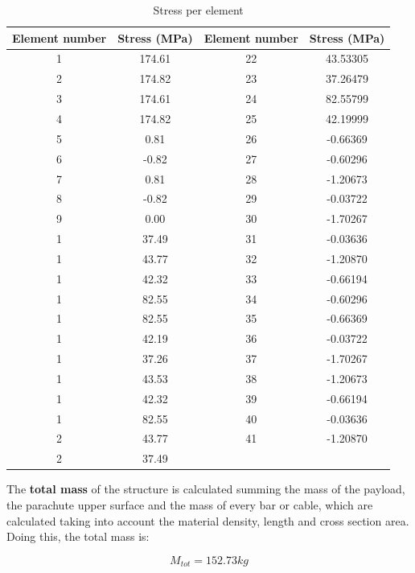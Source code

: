 \begin{table}[h]
\centering
\begin{tabular}{|c|c|c|c|}
\hline
\textbf{Element number} & \textbf{Stress (MPa)} & \textbf{Element number} & \textbf{Stress (MPa)} \\ \hline
1 &  174.61  &  22 &  43.53305 \\ \hline
2 &  174.82  &  23 &  37.26479 \\ \hline
3 &  174.61  &  24 &  82.55799 \\ \hline
4 &  174.82  &  25 &  42.19999 \\ \hline
5 &    0.81  &  26 &  -0.66369 \\ \hline
6 &   -0.82  &  27 &  -0.60296 \\ \hline
7 &    0.81  &  28 &  -1.20673 \\ \hline
8 &   -0.82  &  29 &  -0.03722 \\ \hline
9 &    0.00  &  30 &  -1.70267 \\ \hline
1 &    37.49 &   31 &  -0.03636 \\ \hline
1 &    43.77 &   32 &  -1.20870 \\ \hline
1 &    42.32 &   33 &  -0.66194 \\ \hline
1 &    82.55 &   34 &  -0.60296 \\ \hline
1 &    82.55 &   35 &  -0.66369 \\ \hline
1 &    42.19 &   36 &  -0.03722 \\ \hline
1 &    37.26 &   37 &  -1.70267 \\ \hline
1 &    43.53 &   38 &  -1.20673 \\ \hline
1 &    42.32 &   39 &  -0.66194 \\ \hline
1 &    82.55 &   40 &  -0.03636 \\ \hline
2 &    43.77 &   41 &  -1.20870 \\ \hline
2 &    37.49 &    &   \\ \hline
\end{tabular}
\caption{Stress per element}
\label{tab:stress}
\end{table}

The \textbf{total mass} of the structure is calculated summing the mass of the payload,
the parachute upper surface and the mass of every bar or cable, which are
calculated taking into account the material density, length and cross section
area. Doing this, the total mass is:

\begin{equation}
	\boxed{M_{tot} = 152.73 kg}
\end{equation}

